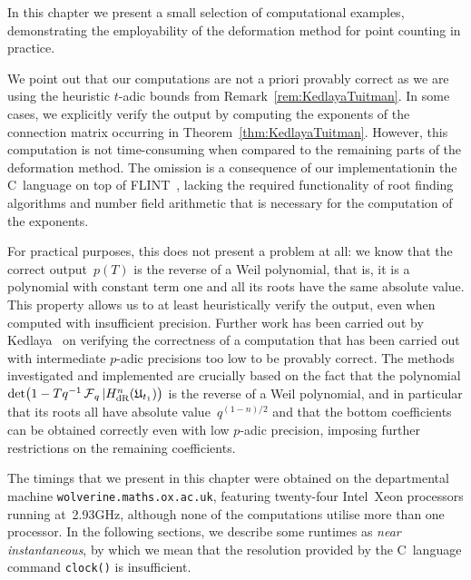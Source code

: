 
In this chapter we present a small selection of computational examples, 
demonstrating the employability of the deformation method for point counting 
in practice.

We point out that our computations are not a priori provably 
correct as we are using the heuristic $t$-adic bounds from 
Remark~\ref{rem:KedlayaTuitman}.  In some cases, we explicitly 
verify the output by computing the exponents of the connection 
matrix occurring in Theorem~\ref{thm:KedlayaTuitman}.  However, 
this computation is not time-consuming when compared to the 
remaining parts of the deformation method.  The omission is 
a consequence of our implementation\footnotemark in the C~language 
on top of FLINT~\citep{FLINT}, lacking the required functionality 
of root finding algorithms and number field arithmetic that is 
necessary for the computation of the exponents.  


For practical purposes, this does not present a problem at all:  we know 
that the correct output~$p(T)$ is the reverse of a Weil polynomial, that 
is, it is a polynomial with constant term one and all its roots have 
the same absolute value.  This property allows us to at least 
heuristically verify the output, even when computed with insufficient 
precision.  Further work has been carried out by Kedlaya~\citep{Kedlaya2008} 
on verifying the correctness of a computation that has been carried out 
with intermediate $p$-adic precisions too low to be provably correct. 
The methods investigated and implemented are crucially based on the 
fact that the polynomial 
\mbox{$\det\bigl(1 - T q^{-1} \operatorname{\mathcal{F}}_q | H_{\text{dR}}^{n}(\mathfrak{U}_{t_1})\bigr)$} 
is the reverse of a Weil polynomial, and in particular that its 
roots all have absolute value~$q^{(1-n)/2}$ and that the bottom 
coefficients can be obtained correctly even with low $p$-adic precision, 
imposing further restrictions on the remaining coefficients.

The timings that we present in this chapter were obtained on the 
departmental machine {\tt{wolverine.maths.ox.ac.uk}}, featuring twenty-four 
\mbox{Intel Xeon} processors running at~2.93GHz, although none of the 
computations utilise more than one processor.  In the following sections, 
we describe some runtimes as \emph{near instantaneous}, by which we mean 
that the resolution provided by the C~language command {\tt{clock()}} is 
insufficient.

